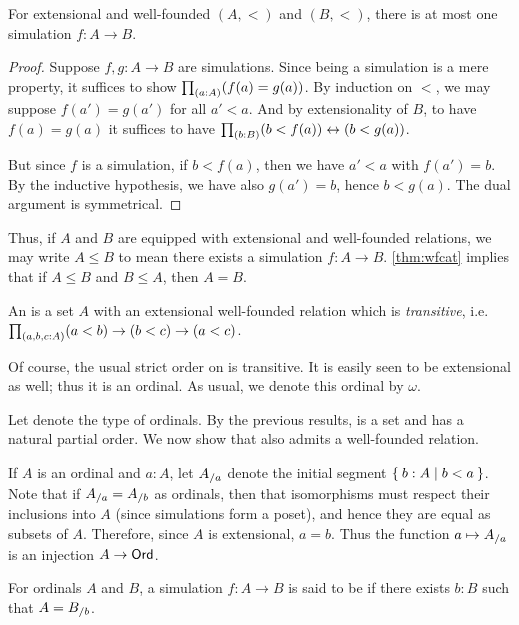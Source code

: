 \begin{lem}
  For extensional and well-founded $(A,<)$ and $(B,<)$, there is at most one simulation $f:A\to B$.
\end{lem}
\begin{proof}
  Suppose $f,g:A\to B$ are simulations.
  Since being a simulation is a mere property, it suffices to show $\prd{a:A}(f(a)=g(a))$.
  By induction on $<$, we may suppose $f(a')=g(a')$ for all $a'<a$.
  And by extensionality of $B$, to have $f(a)=g(a)$ it suffices to have $\prd{b:B}(b<f(a)) \leftrightarrow (b<g(a))$.

  But since $f$ is a simulation, if $b<f(a)$, then we have $a'<a$ with $f(a')=b$.
  By the inductive hypothesis, we have also $g(a')=b$, hence $b<g(a)$.
  The dual argument is symmetrical.
\end{proof}

Thus, if $A$ and $B$ are equipped with extensional and well-founded relations, we may write $A\le B$ to mean there exists a simulation $f:A\to B$.
\autoref{thm:wfcat} implies that if $A\le B$ and $B\le A$, then $A=B$.

\begin{defn}
  An  is a set $A$ with an extensional well-founded relation which is \emph{transitive}, i.e.\ $\prd{a,b,c:A}(a<b)\to (b<c) \to (a<c)$.
\end{defn}

\begin{eg}
  Of course, the usual strict order on \nat is transitive.
  It is easily seen to be extensional as well; thus it is an ordinal.
  As usual, we denote this ordinal by $\omega$.
\end{eg}

Let \ord denote the type of ordinals.
By the previous results, \ord is a set and has a natural partial order.
We now show that \ord also admits a well-founded relation.

If $A$ is an ordinal and $a:A$, let ${A}_{/a}$ denote the initial segment $\Set{ b:A | b<a}$.
Note that if ${A}_{/a} = {A}_{/b}$ as ordinals, then that isomorphisms must respect their inclusions into $A$ (since simulations form a poset), and hence they are equal as subsets of $A$.
Therefore, since $A$ is extensional, $a=b$.
Thus the function $a\mapsto {A}_{/a}$ is an injection $A\to \mathsf{Ord}$.

\begin{defn}
  For ordinals $A$ and $B$, a simulation $f:A\to B$ is said to be  if there exists $b:B$ such that $A = {B}_{/b}$.
\end{defn}

